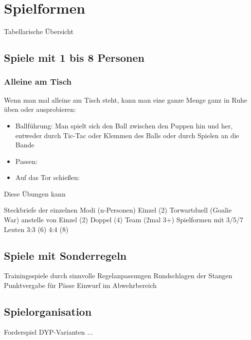 \chapter{Spielformen}

 Tabellarische Übersicht

\section{Spiele mit 1 bis 8 Personen}

\subsection{Alleine am Tisch}

Wenn man mal alleine am Tisch steht, kann man eine ganze Menge ganz in Ruhe üben oder ausprobieren:
\begin{itemize}
\item Ballführung: Man spielt sich den Ball zwischen den Puppen hin und her, entweder durch Tic-Tac oder Klemmen des Balls oder durch Spielen an die Bande 
\item Passen:
\item Auf das Tor schießen: 
\end{itemize}
Diese Übungen kann

Steckbriefe der einzelnen Modi (n-Personen)
Einzel (2)
Torwartduell (Goalie War) anstelle von Einzel (2)
Doppel (4)
Team (2mal 3+)
Spielformen mit 3/5/7 Leuten
3:3 (6)
4:4 (8)

\section{Spiele mit Sonderregeln}
Trainingsspiele durch sinnvolle Regelanpassungen
Rundschlagen der Stangen
Punktvergabe für Pässe
Einwurf im Abwehrbereich

\section{Spielorganisation}
Forderspiel
DYP-Varianten
...

